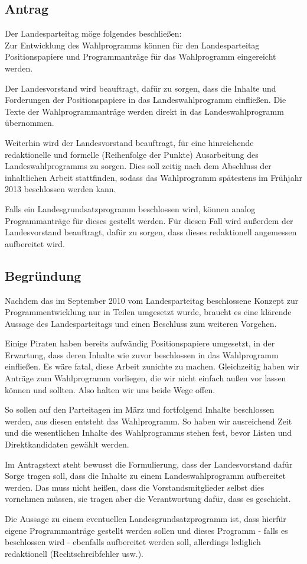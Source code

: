 \documentclass[12pt,a4paper,oneside]{scrbook}
\begin{document}
\subsection{Antrag}
Der Landesparteitag möge folgendes beschließen:\\
Zur Entwicklung des Wahlprogramms können für den Landesparteitag Positionspapiere und
Programmanträge für das Wahlprogramm eingereicht werden.\par
Der Landesvorstand wird beauftragt, dafür zu sorgen, dass die Inhalte und Forderungen der
Positionspapiere in das Landeswahlprogramm einfließen. Die Texte der Wahlprogrammanträge
werden direkt in das Landeswahlprogramm übernommen.\par
Weiterhin wird der Landesvorstand beauftragt, für eine hinreichende redaktionelle und formelle
(Reihenfolge der Punkte) Ausarbeitung des Landeswahlprogramms zu sorgen. Dies soll zeitig nach
dem Abschluss der inhaltlichen Arbeit stattfinden, sodass das Wahlprogramm spätestens im
Frühjahr 2013 beschlossen werden kann.\par
Falls ein Landesgrundsatzprogramm beschlossen wird, können analog Programmanträge für dieses
gestellt werden. Für diesen Fall wird außerdem der Landesvorstand beauftragt, dafür zu sorgen,
dass dieses redaktionell angemessen aufbereitet wird.
\subsection{Begründung}
Nachdem das im September 2010 vom Landesparteitag beschlossene Konzept zur
Programmentwicklung nur in Teilen umgesetzt wurde, braucht es eine klärende Aussage des
Landesparteitags und einen Beschluss zum weiteren Vorgehen.\par
Einige Piraten haben bereits aufwändig Positionspapiere umgesetzt, in der Erwartung, dass deren
Inhalte wie zuvor beschlossen in das Wahlprogramm einfließen. Es wäre fatal, diese Arbeit zunichte
zu machen. Gleichzeitig haben wir Anträge zum Wahlprogramm vorliegen, die wir nicht einfach
außen vor lassen können und sollten. Also halten wir uns beide Wege offen.\par
So sollen auf den Parteitagen im März und fortfolgend Inhalte beschlossen werden, aus diesen
entsteht das Wahlprogramm. So haben wir ausreichend Zeit und die wesentlichen Inhalte des
Wahlprogramms stehen fest, bevor Listen und Direktkandidaten gewählt werden.\par
Im Antragstext steht bewusst die Formulierung, dass der Landesvorstand dafür Sorge tragen soll,
dass die Inhalte zu einem Landeswahlprogramm aufbereitet werden. Das muss nicht heißen, dass
die Vorstandsmitglieder selbst dies vornehmen müssen, sie tragen aber die Verantwortung dafür,
dass es geschieht.\par
Die Aussage zu einem eventuellen Landesgrundsatzprogramm ist, dass hierfür eigene
Programmanträge gestellt werden sollen und dieses Programm - falls es beschlossen wird -
ebenfalls aufbereitet werden soll, allerdings lediglich redaktionell (Rechtschreibfehler usw.).
\end{document}
